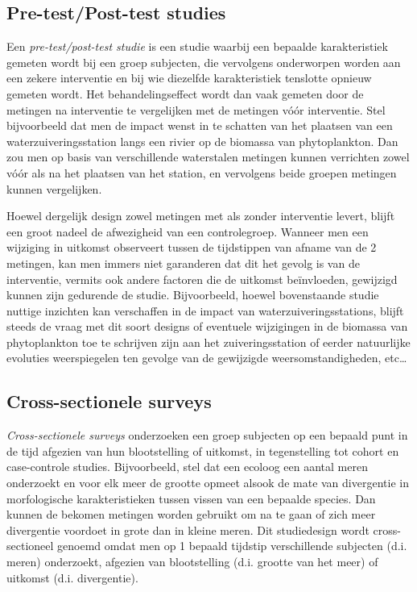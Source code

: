 \documentclass[
  dutch,
  letterpaper,
  12pt]{book}
\theoremstyle{definition}
\theoremstyle{definition}
\theoremstyle{definition}
\theoremstyle{remark}
\begin{document}
\subsection{Pre-test/Post-test studies}\label{sec-prepost}

Een \emph{pre-test/post-test studie} is een studie waarbij een bepaalde
karakteristiek gemeten wordt bij een groep subjecten, die vervolgens
onderworpen worden aan een zekere interventie en bij wie diezelfde
karakteristiek tenslotte opnieuw gemeten wordt. Het behandelingseffect
wordt dan vaak gemeten door de metingen na interventie te vergelijken
met de metingen vóór interventie. Stel bijvoorbeeld dat men de impact
wenst in te schatten van het plaatsen van een waterzuiveringsstation
langs een rivier op de biomassa van phytoplankton. Dan zou men op basis
van verschillende waterstalen metingen kunnen verrichten zowel vóór als
na het plaatsen van het station, en vervolgens beide groepen metingen
kunnen vergelijken.

Hoewel dergelijk design zowel metingen met als zonder interventie
levert, blijft een groot nadeel de afwezigheid van een controlegroep.
Wanneer men een wijziging in uitkomst observeert tussen de tijdstippen
van afname van de 2 metingen, kan men immers niet garanderen dat dit het
gevolg is van de interventie, vermits ook andere factoren die de
uitkomst beïnvloeden, gewijzigd kunnen zijn gedurende de studie.
Bijvoorbeeld, hoewel bovenstaande studie nuttige inzichten kan
verschaffen in de impact van waterzuiveringsstations, blijft steeds de
vraag met dit soort designs of eventuele wijzigingen in de biomassa van
phytoplankton toe te schrijven zijn aan het zuiveringsstation of eerder
natuurlijke evoluties weerspiegelen ten gevolge van de gewijzigde
weersomstandigheden, etc\ldots{}

\subsection{Cross-sectionele surveys}\label{cross-sectionele-surveys}

\emph{Cross-sectionele surveys} onderzoeken een groep subjecten op een
bepaald punt in de tijd afgezien van hun blootstelling of uitkomst, in
tegenstelling tot cohort en case-controle studies. Bijvoorbeeld, stel
dat een ecoloog een aantal meren onderzoekt en voor elk meer de grootte
opmeet alsook de mate van divergentie in morfologische karakteristieken
tussen vissen van een bepaalde species. Dan kunnen de bekomen metingen
worden gebruikt om na te gaan of zich meer divergentie voordoet in grote
dan in kleine meren. Dit studiedesign wordt cross-sectioneel genoemd
omdat men op 1 bepaald tijdstip verschillende subjecten (d.i. meren)
onderzoekt, afgezien van blootstelling (d.i. grootte van het meer) of
uitkomst (d.i. divergentie).
\end{document}
